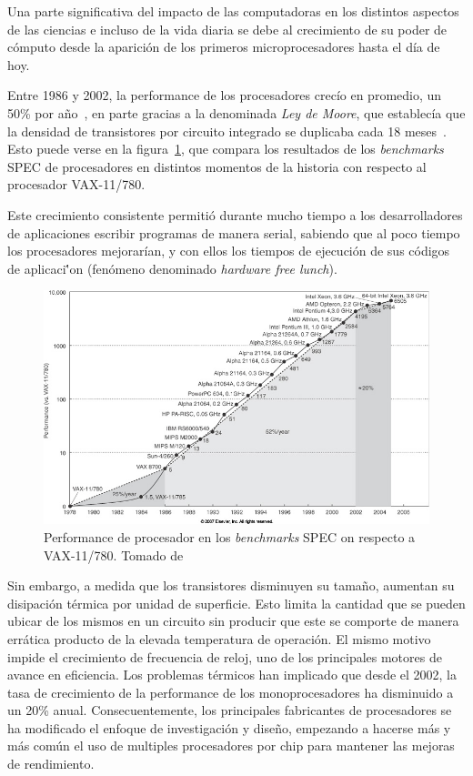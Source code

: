Una parte significativa del impacto de las computadoras en los distintos aspectos de las
ciencias e incluso de la vida diaria se debe al crecimiento de su
poder de c\'omputo desde la aparici\'on de los primeros microprocesadores hasta el
d\'ia de hoy.

Entre 1986 y 2002, la performance de los procesadores crec\'io en promedio, un 50\%
por a\~no~\cite{Pacheco}, en parte gracias a la denominada \textit{Ley de Moore}, que
establec\'ia que la densidad de transistores por circuito integrado se duplicaba
cada 18 meses~\cite{HennessyPatterson}. Esto puede verse en la figura~\ref{processor_performance},
que compara los resultados de los \textit{benchmarks} SPEC de procesadores en distintos
momentos de la historia con respecto al procesador VAX-11/780.

Este crecimiento consistente permiti\'o durante mucho tiempo a los desarrolladores
de aplicaciones escribir programas de manera serial, sabiendo que al poco tiempo los procesadores
mejorar\'ian, y con ellos los tiempos de ejecuci\'on de sus c\'odigos de aplicaci\''on (fen\'omeno denominado
\textit{hardware free lunch}).

\begin{figure}[htbp]
   \centering
   \includegraphics[width=\textwidth]{images/processor-performance.jpg}
   \caption{Performance de procesador en los \textit{benchmarks} SPEC on respecto a VAX-11/780. Tomado de~\cite{HennessyPatterson}}
   \label{processor_performance}
\end{figure}

Sin embargo, a medida que los transistores disminuyen su tama\~no, aumentan su
disipaci\'on t\'ermica por unidad de superficie.  Esto limita la cantidad que se pueden ubicar de los mismos
en un circuito sin producir que este se comporte de manera err\'atica producto
de la elevada temperatura de operaci\'on. El mismo motivo impide el crecimiento de frecuencia de reloj, uno de los
principales motores de avance en eficiencia. Los problemas t\'ermicos han implicado que
desde el 2002, la tasa de crecimiento de la performance de los monoprocesadores ha disminuido a un 20\% anual.
Consecuentemente, los principales fabricantes de procesadores se ha modificado el enfoque de investigaci\'on y dise\~no, empezando
a hacerse m\'as y m\'as com\'un el uso de multiples procesadores por chip para mantener las mejoras de rendimiento.

